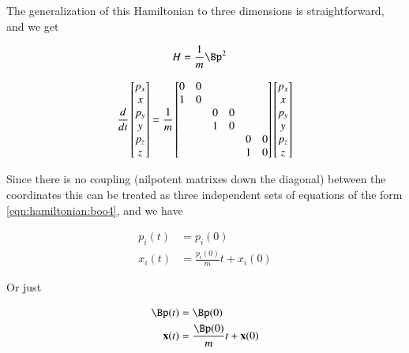 The generalization of this Hamiltonian to three dimensions is straightforward, and we get

\begin{align}\label{eqn:hamiltonian:boo9}
H &= \inv{m} \Bp^2 
\end{align}

\begin{align}\label{eqn:hamiltonian:boo10}
\frac{d}{dt}
\begin{bmatrix}
p_x \\
x \\
p_y \\
y \\
p_z \\
z \\
\end{bmatrix}
=
\frac{1}{m}
\begin{bmatrix}
0 & 0 &   &   &   &   \\
1 & 0 &   &   &   &   \\
  &   & 0 & 0 &   &   \\
  &   & 1 & 0 &   &   \\
  &   &   &   & 0 & 0 \\
  &   &   &   & 1 & 0 \\
\end{bmatrix}
\begin{bmatrix}
p_x \\
x \\
p_y \\
y \\
p_z \\
z \\
\end{bmatrix}
\end{align}

Since there is no coupling (nilpotent matrixes down the diagonal) between the coordinates this can be treated as three independent sets of equations of the form \ref{eqn:hamiltonian:boo4}, and we have

\begin{align}\label{eqn:hamiltonian:boo11}
p_i(t) &= p_i(0) \\
x_i(t) &= \frac{p_i(0)}{m} t + x_i(0)
\end{align}

Or just

\begin{align}\label{eqn:hamiltonian:boo12}
\Bp(t) &= \Bp(0) \\
\Bx(t) &= \frac{\Bp(0)}{m} t + \Bx(0)
\end{align}

